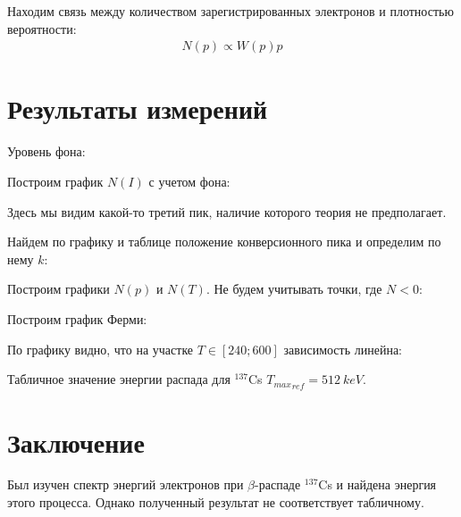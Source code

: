 \documentclass[12pt]{article}
\begin{document}
Находим связь между количеством зарегистрированных электронов и плотностью вероятности:
\begin{gather*}
    N(p) \propto W(p) p
\end{gather*}

\section{Результаты измерений}

\begin{table}[H]
\begin{center}

\end{center}
\end{table}

Уровень фона:


Построим график $N(I)$ с учетом фона:

\begin{figure}[H]
    \centering
    
\end{figure}

Здесь мы видим какой-то третий пик, наличие которого теория не предполагает.

Найдем по графику и таблице положение конверсионного пика и определим по нему $k$:


\begin{table}[H]
\begin{center}

\end{center}
\end{table}

Построим графики $N(p)$ и $N(T)$. Не будем учитывать точки, где $N < 0$:

\begin{figure}[H]
    \centering
    
\end{figure}

\begin{figure}[H]
    \centering
    
\end{figure}

Построим график Ферми:

\begin{figure}[H]
    \centering
    
\end{figure}

По графику видно, что на участке $T \in [240; 600]$ зависимость линейна:


Табличное значение энергии распада для ${^{137}}$Cs ${T_{max}}_{ref}= \qty[]{512}{keV}$.

\section{Заключение}
Был изучен спектр энергий электронов при $\beta$-распаде ${^{137}}$Cs и найдена энергия этого процесса.
Однако полученный результат не соответствует табличному.
\end{document}
